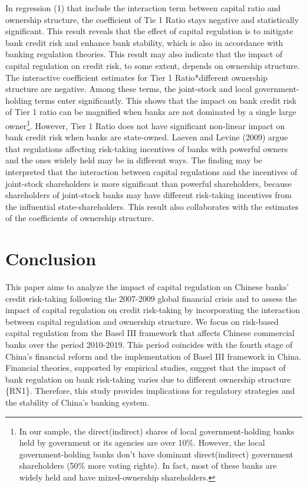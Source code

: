 \documentclass{article}
\begin{document}
In regression (1) that include the interaction term between capital
ratio and ownership structure, the coefficient of Tie 1 Ratio stays
negative and statistically significant. This result reveals that the
effect of capital regulation is to mitigate bank credit risk and enhance
bank stability, which is also in accordance with banking regulation
theories. This result may also indicate that the impact of capital
regulation on credit risk, to some extent, depends on ownership
structure. The interactive coefficient estimates for Tier 1
Ratio*different ownership structure are negative. Among these terms, the
joint-stock and local government-holding terms enter significantly. This
shows that the impact on bank credit risk of Tier 1 ratio can be
magnified when banks are not dominated by a single large
owner\footnote{In our sample, the direct(indirect) shares of local
  government-holding banks held by government or its agencies are over
  10\%. However, the local government-holding banks don't have dominant
  direct(indirect) government shareholders (50\% more voting rights). In
  fact, most of these banks are widely held and have mixed-ownership
  shareholders.}. However, Tier 1 Ratio does not have significant
non-linear impact on bank credit risk when banks are state-owned. Laeven
and Levine (2009) argue that regulations affecting risk-taking
incentives of banks with powerful owners and the ones widely held may be
in different ways. The finding may be interpreted that the interaction
between capital regulations and the incentives of joint-stock
shareholders is more significant than powerful shareholders, because
shareholders of joint-stock banks may have different risk-taking
incentives from the influential state-shareholders. This result also
collaborates with the estimates of the coefficients of ownership
structure.

\hypertarget{conclusion}{%
\section{Conclusion}\label{conclusion}}

This paper aims to analyze the impact of capital regulation on Chinese
banks' credit risk-taking following the 2007-2009 global financial
crisis and to assess the impact of capital regulation on credit
risk-taking by incorporating the interaction between capital regulation
and ownership structure. We focus on risk-based capital regulation from
the Basel III framework that affects Chinese commercial banks over the
period 2010-2019. This period coincides with the fourth stage of China's
financial reform and the implementation of Basel III framework in China.
Financial theories, supported by empirical studies, suggest that the
impact of bank regulation on bank risk-taking varies due to different
ownership structure \{RN1\}. Therefore, this study provides implications
for regulatory strategies and the stability of China's banking system.
\end{document}
